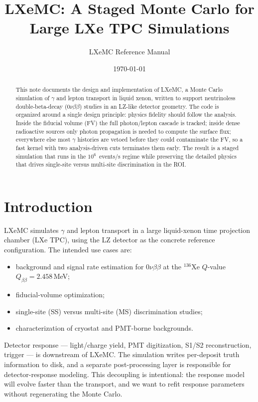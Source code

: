 \documentclass[11pt]{article}
\title{LXeMC: A Staged Monte Carlo for Large LXe TPC Simulations}
\author{LXeMC Reference Manual}
\date{\today}
\begin{document}
\maketitle

\begin{abstract}
This note documents the design and implementation of LXeMC, a Monte Carlo
simulation of $\gamma$ and lepton transport in liquid xenon, written to support
neutrinoless double-beta-decay ($0\nu\beta\beta$) studies in an LZ-like detector
geometry. The code is organized around a single design principle: physics
fidelity should follow the analysis. Inside the fiducial volume (FV) the full
photon/lepton cascade is tracked; inside dense radioactive sources only photon
propagation is needed to compute the surface flux; everywhere else most $\gamma$
histories are vetoed before they could contaminate the FV, so a fast kernel with
two analysis-driven cuts terminates them early. The result is a staged
simulation that runs in the $10^{6}$~events/s regime while preserving the
detailed physics that drives single-site versus multi-site discrimination in the
ROI.
\end{abstract}

\section{Introduction}
\label{sec:intro}

LXeMC simulates $\gamma$ and lepton transport in a large liquid-xenon time
projection chamber (LXe TPC), using the LZ detector as the concrete reference
configuration. The intended use cases are:

\begin{itemize}
\item background and signal rate estimation for $0\nu\beta\beta$ at the $^{136}$Xe
$Q$-value $Q_{\beta\beta} = 2.458$\,MeV;
\item fiducial-volume optimization;
\item single-site (SS) versus multi-site (MS) discrimination studies;
\item characterization of cryostat and PMT-borne backgrounds.
\end{itemize}

Detector response --- light/charge yield, PMT digitization, S1/S2 reconstruction,
trigger --- is downstream of LXeMC. The simulation writes per-deposit truth
information to disk, and a separate post-processing layer is responsible for
detector-response modeling. This decoupling is intentional: the response model
will evolve faster than the transport, and we want to refit response parameters
without regenerating the Monte Carlo.
\end{document}
